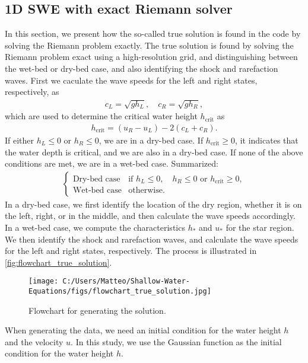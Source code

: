 \subsection*{1D SWE with exact Riemann solver}
In this section, we present how the so-called true solution is found in the code by solving the Riemann problem exactly.
The true solution is found by solving the Riemann problem exact using a high-resolution grid, and distinguishing between the wet-bed or dry-bed case, and also identifying the shock and rarefaction waves.
First we caculate the wave speeds for the left and right states, respectively, as
\begin{align*}
    c_L = \sqrt{g h_L}, \quad c_R = \sqrt{g h_R},
\end{align*}
which are used to determine the critical water height $h_{\text{crit}}$ as
\begin{align*}
    h_{\text{crit}} = (u_R - u_L) - 2(c_L + c_R).
\end{align*}
If either $h_L \leq 0$ or $h_R \leq 0$, we are in a dry-bed case.
If $h_{\text{crit}} \geq 0$, it indicates that the water depth is critical, and we are also in a dry-bed case.
If none of the above conditions are met, we are in a wet-bed case.
Summarized:
\begin{align*}
    \begin{cases}
        \text{Dry-bed case} & \text{if }  h_L \leq 0, \quad  h_R \leq 0 \text{ or } h_{\text{crit}} \geq 0, \\
        \text{Wet-bed case} & \text{otherwise}.
    \end{cases}
\end{align*}
In a dry-bed case, we first identify the location of the dry region, whether it is on the left, right, or in the middle, and then calculate the wave speeds accordingly.
In a wet-bed case, we compute the characteristics $h_*$ and $u_*$ for the star region.
We then identify the shock and rarefaction waves, and calculate the wave speeds for the left and right states, respectively.
The process is illustrated in \autoref{fig:flowchart_true_solution}.
\begin{figure}[H]
    \centering
    \texttt{[image: C:/Users/Matteo/Shallow-Water-Equations/figs/flowchart\_true\_solution.jpg]}
    \caption{Flowchart for generating the solution.}\label{fig:flowchart_true_solution}
\end{figure}
When generating the data, we need an initial condition for the water height $h$ and the velocity $u$.
In this study, we use the Gaussian function as the initial condition for the water height $h$.
